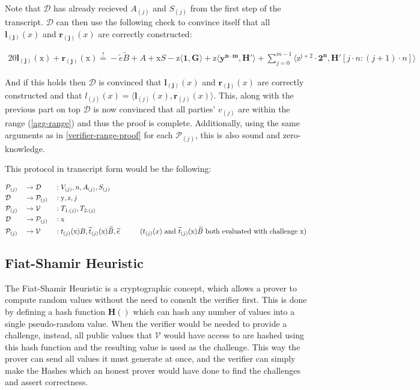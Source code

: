 \documentclass{article}
\newcommand{\eq}[1]{\begin{alignat*}{20}#1\end{alignat*}}
\renewcommand{\vec}[1]{\boldsymbol{#1}}
\newcommand{\ran}[1]{\mathrm{#1}}
\newcommand{\vecran}[1]{\mathbf{#1}}
\newcommand{\V}{\mathcal{V}}
\renewcommand{\P}{\mathcal{P}}
\newcommand{\D}{\mathcal{D}}
\newcommand{\dotp}[2]{\langle #1, #2 \rangle}
\newcommand{\tB}{\widetilde{B}}
\renewcommand{\tt}{\widetilde{t}}
\begin{document}
Note that $\D$ has already recieved $A_{(j)}$ and $S_{(j)}$ from the
first step of the transcript. $\D$ can then use the following check
to convince itself that all $\vec{l_{(j)}}(x)$ and $\vec{r_{(j)}}(x)$
are correctly constructed:

\eq{
	\vec{l_{(j)}}(\ran{x}) + \vec{r_{(j)}}(\ran{x}) \stackrel{?}{=} -\widetilde{e}\widetilde{B} + A + \ran{x}S - \ran{z}\dotp{\vec{1}}{\vec{G}} + \ran{z}\dotp{\vecran{y^{n \cdot m}}}{\vec{H'}} + \sum^{m-1}_{j = 0}\dotp{\ran{z^{j+2}} \cdot \vec{2^n}}{\vec{H'}[j \cdot n: (j+1) \cdot n]}
}

And if this holds then $\D$ is convinced that $\vec{l_{(j)}}(x)$ and
$\vec{r_{(j)}}(x)$ are correctly constructed and that $l_{(j)}(x)
= \dotp{\vec{l}_{(j)}(x)}{\vec{r}_{(j)}(x)}$. This, along with
the previous part on top $\D$ is now convinced that all parties'
$v_{(j)}$ are within the range (\ref{agg-range}) and thus the
proof is complete. Additionally, using the same arguments as in
\ref{verifier-range-proof} for each $\P_{(j)}$, this is also sound
and zero-knowledge.

This protocol in transcript form would be the following: 

\eq{
	&\P_{(j)} &&\rightarrow \D &&: V_{(j)}, n, A_{(j)}, S_{(j)} \\
	&\D &&\rightarrow \P_{(j)} &&: \ran{y}, \ran{z}, j \\
	&\P_{(j)} &&\rightarrow \V &&: T_{1, (j)}, T_{2,(j)} \\
	&\D &&\rightarrow \P_{(j)} &&: \ran{x} \\
	&\P_{(j)} &&\rightarrow \V &&: t_{(j)}(\ran{x})B, \tt_{(j)}(\ran{x})\tB, \widetilde{e} \hspace*{1cm}\text{($t_{(j)}(x)$ and $\tt_{(j)}(\ran{x})\tB$ both evaluated with challenge $\ran{x}$)}\\
}

\subsection{Fiat-Shamir Heuristic}\label{fiat-shamir-heuristic}

The Fiat-Shamir Heuristic is a cryptographic concept, which allows a
prover to compute random values without the need to consult the verifier
first. This is done by defining a hash function $\textbf{H}()$ which
can hash any number of values into a single pseudo-random value. When
the verifier would be needed to provide a challenge, instead, all
public values that $\V$ would have access to are hashed using this
hash function and the resulting value is used as the challenge. This
way the prover can send all values it must generate at once, and the
verifier can simply make the Hashes which an honest prover would have
done to find the challenges and assert correctness.
\end{document}
